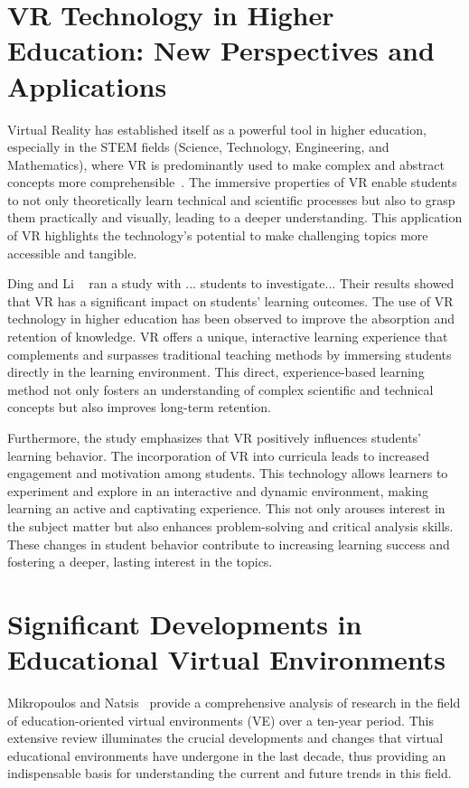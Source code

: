 \documentclass[draft, final]{vutinfth} %
\begin{document}
\section{VR Technology in Higher Education: New Perspectives and Applications}

Virtual Reality has established itself as a powerful tool in higher education, especially in the STEM fields (Science, Technology, Engineering, and Mathematics), where VR is predominantly used to make complex and abstract concepts more comprehensible~\cite{ding2022review}. The immersive properties of VR enable students to not only theoretically learn technical and scientific processes but also to grasp them practically and visually, leading to a deeper understanding. This application of VR highlights the technology's potential to make challenging topics more accessible and tangible.

Ding and Li ~\cite{ding2022review} ran a study with ... students to investigate... Their results showed that VR has a significant impact on students' learning outcomes. The use of VR technology in higher education has been observed to improve the absorption and retention of knowledge. VR offers a unique, interactive learning experience that complements and surpasses traditional teaching methods by immersing students directly in the learning environment. This direct, experience-based learning method not only fosters an understanding of complex scientific and technical concepts but also improves long-term retention.

Furthermore, the study emphasizes that VR positively influences students' learning behavior. The incorporation of VR into curricula leads to increased engagement and motivation among students. This technology allows learners to experiment and explore in an interactive and dynamic environment, making learning an active and captivating experience. This not only arouses interest in the subject matter but also enhances problem-solving and critical analysis skills. These changes in student behavior contribute to increasing learning success and fostering a deeper, lasting interest in the topics.

\section{Significant Developments in Educational Virtual Environments}

Mikropoulos and Natsis~\cite{mikropoulos2011educational} provide a comprehensive analysis of research in the field of education-oriented virtual environments (VE) over a ten-year period. This extensive review illuminates the crucial developments and changes that virtual educational environments have undergone in the last decade, thus providing an indispensable basis for understanding the current and future trends in this field.
\end{document}
